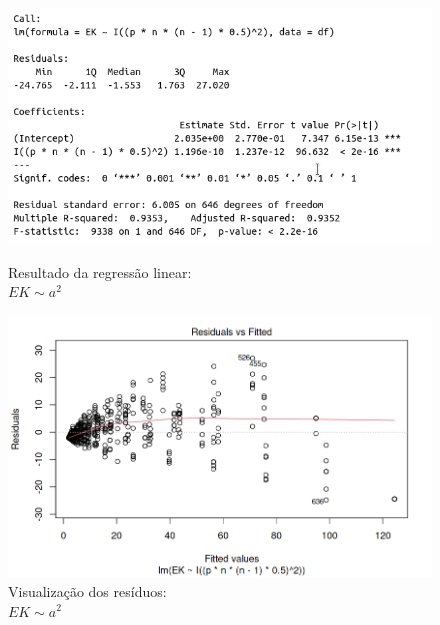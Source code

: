 \documentclass{uofa-eng-assignment}
\begin{document}
\vspace{0.2\linewidth}
\begin{figure}[h]
    \centering
    \begin{minipage}{0.45\textwidth}
        \centering
        \includegraphics[width=1.2\textwidth]{ek_a^2_lm.png}
        \captionsetup{justification=centering}
        \caption{Resultado da regressão linear: \\$EK \sim a^2$}
        \label{fig:ek-regression-2}
    \end{minipage}
    \hfill
    \begin{minipage}{0.45\textwidth}
        \centering
        \includegraphics[width=1\textwidth]{ek_a^2_residuals.png}
        \captionsetup{justification=centering}
        \caption{Visualização dos resíduos: \\$EK \sim a^2$}
        \label{fig:ek-residuals}
    \end{minipage}
\end{figure}
\end{document}
